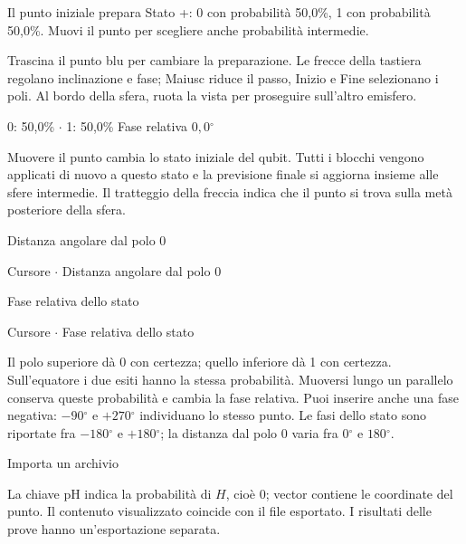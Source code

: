 Il punto iniziale prepara Stato +: 0 con probabilità 50,0\%, 1 con probabilità 50,0\%. Muovi il punto per scegliere anche probabilità intermedie.\par

Trascina il punto blu per cambiare la preparazione. Le frecce della tastiera regolano inclinazione e fase; Maiusc riduce il passo, Inizio e Fine selezionano i poli. Al bordo della sfera, ruota la vista per proseguire sull'altro emisfero.\par

0: 50,0\% \(\cdot\) 1: 50,0\% Fase relativa \(0{,}0{}^{\circ} \)\par

Muovere il punto cambia lo stato iniziale del qubit. Tutti i blocchi vengono applicati di nuovo a questo stato e la previsione finale si aggiorna insieme alle sfere intermedie. Il tratteggio della freccia indica che il punto si trova sulla metà posteriore della sfera.\par

Distanza angolare dal polo 0\par

Cursore \(\cdot\) Distanza angolare dal polo 0\par

Fase relativa dello stato\par

Cursore \(\cdot\) Fase relativa dello stato\par

Il polo superiore dà 0 con certezza; quello inferiore dà 1 con certezza. Sull'equatore i due esiti hanno la stessa probabilità. Muoversi lungo un parallelo conserva queste probabilità e cambia la fase relativa. Puoi inserire anche una fase negativa: \(- 90{}^{\circ} \) e \(+270{}^{\circ} \) individuano lo stesso punto. Le fasi dello stato sono riportate fra \(- 180{}^{\circ} \) e \(+180{}^{\circ} \); la distanza dal polo 0 varia fra \(0{}^{\circ} \) e \(180{}^{\circ} \).\par

Importa un archivio\par

La chiave pH indica la probabilità di \(H\), cioè 0; vector contiene le coordinate del punto. Il contenuto visualizzato coincide con il file esportato. I risultati delle prove hanno un'esportazione separata.\par


